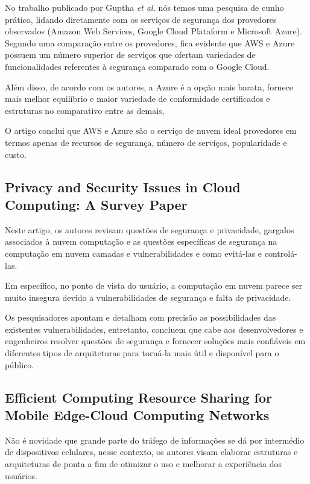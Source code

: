 \documentclass[12pt]{article}
\begin{document}
No trabalho publicado por Guptha \emph{et al.} nós temos uma pesquisa de cunho prático, lidando diretamente com os serviços de segurança dos provedores observados (Amazon Web Services, Google Cloud Plataform e Microsoft Azure). Segundo uma comparação entre os provedores, fica evidente que AWS e Azure possuem um número superior de serviços que ofertam variedades de funcionalidades referentes à segurança comparado com o Google Cloud.

Além disso, de acordo com os autores, a Azure é a opção mais barata, fornece mais melhor equilíbrio e maior variedade de conformidade
certificados e estruturas no comparativo entre as demais, 

O artigo conclui que AWS e Azure são o serviço de nuvem ideal provedores em termos apenas de recursos de segurança, número de serviços, popularidade e custo.

\subsection{Privacy and Security Issues in Cloud Computing: A Survey Paper\cite{bamasoud}}

Neste artigo, os autores revisam questões de segurança e privacidade, gargalos associados à nuvem computação e as questões específicas de segurança na computação em nuvem camadas e vulnerabilidades e como evitá-las e controlá-las.

Em específico, no ponto de vista do usuário, a computação em nuvem parece ser muito insegura devido a vulnerabilidades de segurança e falta de privacidade. 

Os pesquisadores apontam e detalham com precisão as possibilidades das existentes vulnerabilidades, entretanto, concluem que cabe aos desenvolvedores e engenheiros resolver
questões de segurança e fornecer soluções mais confiáveis em diferentes tipos de arquiteturas para torná-la mais útil e disponível para o público.

\subsection{Efficient Computing Resource Sharing for Mobile Edge-Cloud Computing Networks\cite{zhang}}

Não é novidade que grande parte do tráfego de informações se dá por intermédio de dispositivos celulares, nesse contexto, os autores visam elaborar estruturas e arquiteturas de ponta a fim de otimizar o uso e melhorar a experiência dos usuários.
\end{document}
